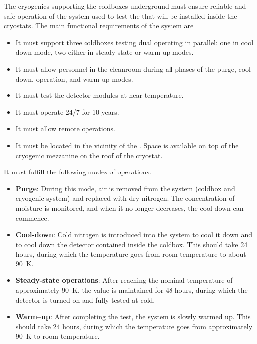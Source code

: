 \label{sec:fdsp-tc-cryocoldbox}

The cryogenics supporting the coldboxes underground must ensure reliable and safe operation of the system used to test the  that will be installed inside the cryostats. The main functional requirements of the system are
\begin{itemize}
\setlength\itemsep{1mm}
\setlength{\parsep}{1mm}
\setlength{\itemsep}{-5mm}
\item It must support three coldboxes testing dual  operating in parallel: one in cool down mode, two either in steady-state or warm-up modes.
\item It must allow personnel in the cleanroom during all phases of the purge, cool down, operation, and warm-up modes. 
\item It must test the detector modules at near  temperature.
\item It must operate 24/7 for 10 years.
\item It must allow remote operations.
\item It must be located in the vicinity of the . Space is available on top of the cryogenic mezzanine on the roof of the cryostat.
\end{itemize}

It must fulfill the following modes of operations:

\begin{itemize}
\setlength\itemsep{1mm}
\setlength{\parsep}{1mm}
\setlength{\itemsep}{-5mm}
\item \textbf{Purge}: During this mode, air is removed from the system (coldbox and cryogenic system) and replaced with dry nitrogen. The concentration of moisture is monitored, and when it no longer decreases, the cool-down can commence.
\item \textbf{Cool-down}: Cold nitrogen is introduced into the system to cool it down and to cool down the detector contained inside the coldbox. This should take 24 hours, during which the temperature goes from room temperature to about \SI{90}{K}. 
\item \textbf{Steady-state operations}: After reaching the nominal temperature of approximately \SI{90}{K}, the value is maintained for 48 hours, during which the detector is turned on and fully tested at cold. 
\item \textbf{Warm--up}: After completing the test, the system is slowly warmed up. This should take 24 hours, during which the temperature goes from approximately \SI{90}{K} to room temperature.
\end{itemize}

